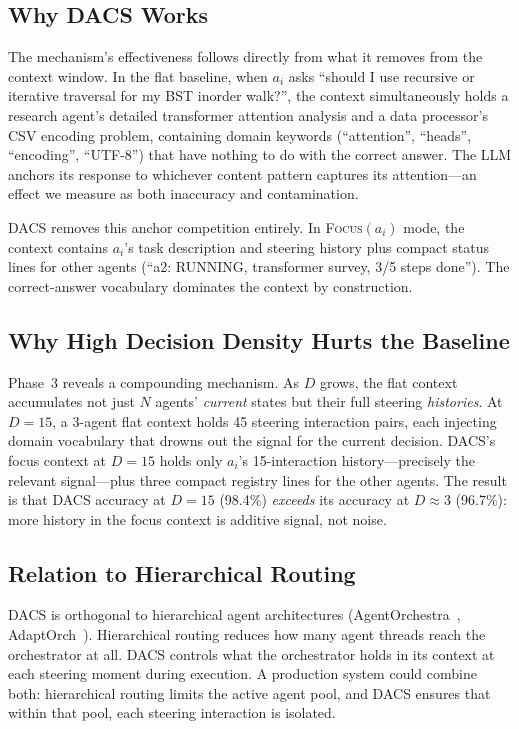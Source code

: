 \documentclass{article}
\begin{document}
\subsection{Why DACS Works}

The mechanism's effectiveness follows directly from what it removes from
the context window.
In the flat baseline, when $a_i$ asks ``should I use recursive or
iterative traversal for my BST inorder walk?'', the context simultaneously
holds a research agent's detailed transformer attention analysis and a
data processor's CSV encoding problem, containing domain keywords
(``attention'', ``heads'', ``encoding'', ``UTF-8'') that have nothing to
do with the correct answer.
The LLM anchors its response to whichever content pattern captures its
attention—an effect we measure as both inaccuracy and contamination.

DACS removes this anchor competition entirely.
In \textsc{Focus}$(a_i)$ mode, the context contains $a_i$'s task
description and steering history plus compact status lines for other
agents (``a2: RUNNING, transformer survey, 3/5 steps done'').
The correct-answer vocabulary dominates the context by construction.

\subsection{Why High Decision Density Hurts the Baseline}

Phase~3 reveals a compounding mechanism.
As $D$ grows, the flat context accumulates not just $N$ agents'
\emph{current} states but their full steering \emph{histories}.
At $D=15$, a 3-agent flat context holds 45 steering interaction pairs,
each injecting domain vocabulary that drowns out the signal for the
current decision.
DACS's focus context at $D=15$ holds only $a_i$'s 15-interaction
history---precisely the relevant signal---plus three compact registry
lines for the other agents.
The result is that DACS accuracy at $D=15$ (98.4\%) \emph{exceeds} its
accuracy at $D\approx 3$ (96.7\%): more history in the focus
context is additive signal, not noise.

\subsection{Relation to Hierarchical Routing}

DACS is orthogonal to hierarchical agent architectures
(AgentOrchestra~\citep{agentorchestra2025},
AdaptOrch~\citep{adaptorch2025b}).
Hierarchical routing reduces how many agent threads reach the
orchestrator at all.
DACS controls what the orchestrator holds in its context at each
steering moment during execution.
A production system could combine both: hierarchical routing limits the
active agent pool, and DACS ensures that within that pool, each steering
interaction is isolated.
\end{document}
